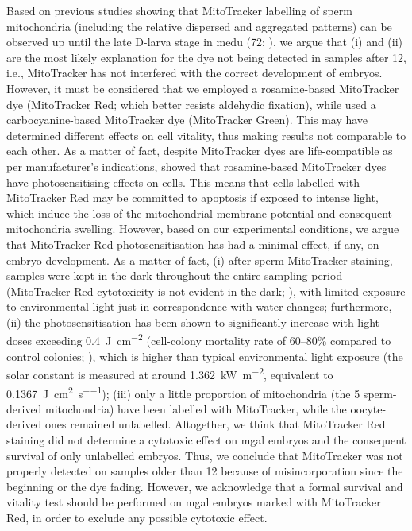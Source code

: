 Based on previous studies showing that MitoTracker labelling of sperm mitochondria (including the relative dispersed and aggregated patterns) can be observed up until the late D-larva stage in \gls{medu} (\qty{72}{\hpf}; ), we argue that (i) and (ii) are the most likely explanation for the dye not being detected in samples after \qty{12}{\hpf}, i.e., MitoTracker has not interfered with the correct development of embryos. However, it must be considered that we employed a rosamine-based MitoTracker dye (MitoTracker Red; which better resists aldehydic fixation), while  used a carbocyanine-based MitoTracker dye (MitoTracker Green). This may have determined different effects on cell vitality, thus making results not comparable to each other. As a matter of fact, despite MitoTracker dyes are life-compatible as per manufacturer's indications,  showed that rosamine-based MitoTracker dyes have photosensitising effects on cells. This means that cells labelled with MitoTracker Red may be committed to apoptosis if exposed to intense light, which induce the loss of the mitochondrial membrane potential and consequent mitochondria swelling. However, based on our experimental conditions, we argue that MitoTracker Red photosensitisation has had a minimal effect, if any, on embryo development. As a matter of fact, (i) after sperm MitoTracker staining, samples were kept in the dark throughout the entire sampling period (MitoTracker Red cytotoxicity is not evident in the dark; ), with limited exposure to environmental light just in correspondence with water changes; furthermore, (ii) the photosensitisation has been shown to significantly increase with light doses exceeding \qty{0.4}{\J\per\square\cm} (cell-colony mortality rate of 60--80\% compared to control colonies; ), which is higher than typical environmental light exposure (the solar constant is measured at around \qty{1.362}{\kW\per\square\m}, equivalent to \qty{0.1367}{\J\per\square\cm\per\s}); (iii) only a little proportion of mitochondria (the 5 sperm-derived mitochondria) have been labelled with MitoTracker, while the oocyte-derived ones remained unlabelled. Altogether, we think that MitoTracker Red staining did not determine a cytotoxic effect on \gls{mgal} embryos and the consequent survival of only unlabelled embryos. Thus, we conclude that MitoTracker was not properly detected on samples older than \qty{12}{\hpf} because of misincorporation since the beginning or the dye fading. However, we acknowledge that a formal survival and vitality test should be performed on \gls{mgal} embryos marked with MitoTracker Red, in order to exclude any possible cytotoxic effect.

